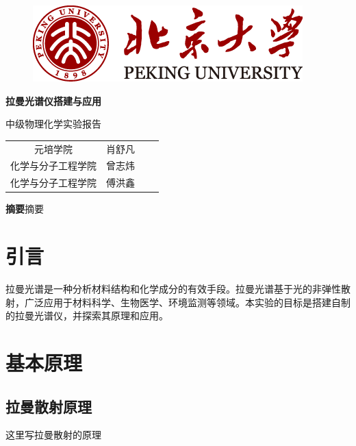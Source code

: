 \documentclass[UTF8]{article}
\newcommand{\expname}{中级物理化学实验报告}
\begin{document}
	
	\begin{titlepage}
		\vspace*{1cm}
		\begin{figure}[h]
			\centering
			\includegraphics[width=0.7\linewidth]{logo}
		\end{figure}
		
		\vspace*{0.5cm}
		
		\begin{center}
			\Huge{\textbf{拉曼光谱仪搭建与应用}}
			
			\Large{\expname}
		\end{center}
		
		\vspace*{0.5cm}
		
		\begin{table}[h]
			\centering
				\begin{tabular}{cccc}
					元培学院 & 肖舒凡 \\
					化学与分子工程学院  & 曾志炜 \\
					化学与分子工程学院  & 傅洪鑫 \\
				\end{tabular}
		\end{table}
	
	\vspace*{1cm}
	
	\textbf{摘要}\quad  摘要
	
	\end{titlepage}
	
	\normalsize

	\section{引言}
	拉曼光谱是一种分析材料结构和化学成分的有效手段。拉曼光谱基于光的非弹性散射，广泛应用于材料科学、生物医学、环境监测等领域。本实验的目标是搭建自制的拉曼光谱仪，并探索其原理和应用。
	

	\section{基本原理}
	\subsection{拉曼散射原理}
	这里写拉曼散射的原理
	
\end{document}
